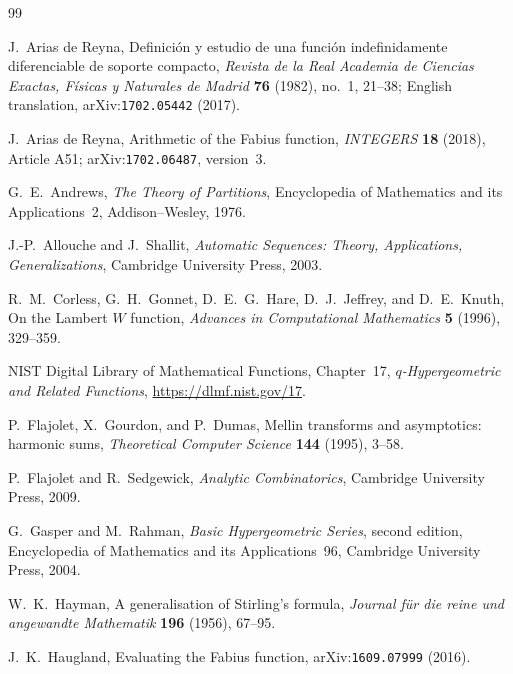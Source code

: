 \documentclass[11pt,oneside]{article}
\theoremstyle{definition}
\theoremstyle{remark}
\begin{document}
\begin{thebibliography}{99}

J.~Arias de Reyna,
\newblock Definici\'on y estudio de una funci\'on indefinidamente diferenciable de soporte
  compacto,
\newblock \emph{Revista de la Real Academia de Ciencias Exactas, F\'isicas y Naturales de
  Madrid} \textbf{76} (1982), no.~1, 21--38;
  English translation, arXiv:\nolinkurl{1702.05442} (2017).

J.~Arias de Reyna,
\newblock Arithmetic of the Fabius function,
\newblock \emph{INTEGERS} \textbf{18} (2018), Article A51;
  arXiv:\nolinkurl{1702.06487}, version~3.

G.~E.~Andrews,
\newblock \emph{The Theory of Partitions},
\newblock Encyclopedia of Mathematics and its Applications~2,
  Addison--Wesley, 1976.

J.-P.~Allouche and J.~Shallit,
\newblock \emph{Automatic Sequences: Theory, Applications, Generalizations},
\newblock Cambridge University Press, 2003.

R.~M.~Corless, G.~H.~Gonnet, D.~E.~G.~Hare, D.~J.~Jeffrey, and D.~E.~Knuth,
\newblock On the Lambert $W$ function,
\newblock \emph{Advances in Computational Mathematics} \textbf{5} (1996), 329--359.

NIST Digital Library of Mathematical Functions, Chapter~17,
\newblock \emph{$q$-Hypergeometric and Related Functions},
\newblock \url{https://dlmf.nist.gov/17}.

P.~Flajolet, X.~Gourdon, and P.~Dumas,
\newblock Mellin transforms and asymptotics: harmonic sums,
\newblock \emph{Theoretical Computer Science} \textbf{144} (1995), 3--58.

P.~Flajolet and R.~Sedgewick,
\newblock \emph{Analytic Combinatorics},
\newblock Cambridge University Press, 2009.

G.~Gasper and M.~Rahman,
\newblock \emph{Basic Hypergeometric Series}, second edition,
\newblock Encyclopedia of Mathematics and its Applications~96,
  Cambridge University Press, 2004.

W.~K.~Hayman,
\newblock A generalisation of Stirling's formula,
\newblock \emph{Journal f\"ur die reine und angewandte Mathematik}
  \textbf{196} (1956), 67--95.

J.~K.~Haugland,
\newblock Evaluating the Fabius function,
\newblock arXiv:\nolinkurl{1609.07999} (2016).


\end{thebibliography}
\end{document}
